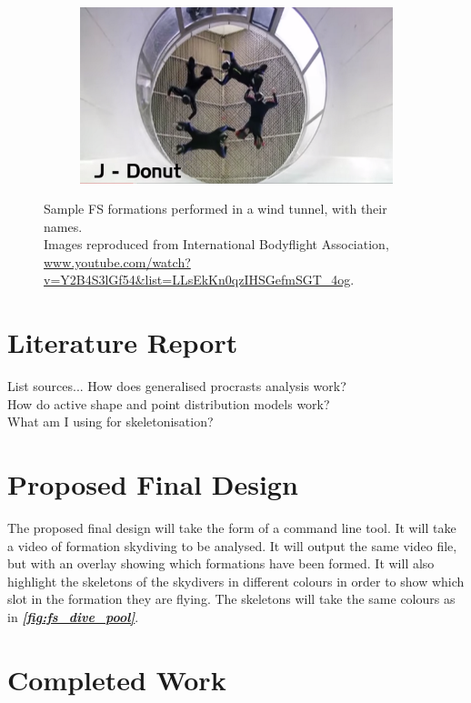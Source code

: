 \documentclass[a4paper, 12pt]{article}
\begin{document}
\begin{figure}[H]
\begin{subfigure}{.5\textwidth}
	\end{subfigure}%
	\begin{subfigure}{.5\textwidth}
		\centering
		\includegraphics[width=0.9\linewidth]{Tunnel_Donut.png}
	\end{subfigure}%
	\caption{Sample FS formations performed in a wind tunnel, with their names.\\
	Images reproduced from International Bodyflight Association, \url{www.youtube.com/watch?v=Y2B4S3lGf54&list=LLsEkKn0qzIHSGefmSGT_4og}. }
	\label{fig:sample_tunnel}
\end{figure}
%
\section{Literature Report}
%
List sources...
How does generalised procrasts analysis work?\\
How do active shape and point distribution models work?\\
What am I using for skeletonisation?
\section{Proposed Final Design}
%
The proposed final design will take the form of a command line tool. It will take a video of formation skydiving to be analysed. It will output the same video file, but with an overlay showing which formations have been formed. It will also highlight the skeletons of the skydivers in different colours in order to show which slot in the formation they are flying. The skeletons will take the same colours as in \textbf{\emph{\ref{fig:fs_dive_pool}}}.
\section{Completed Work}
\end{document}

